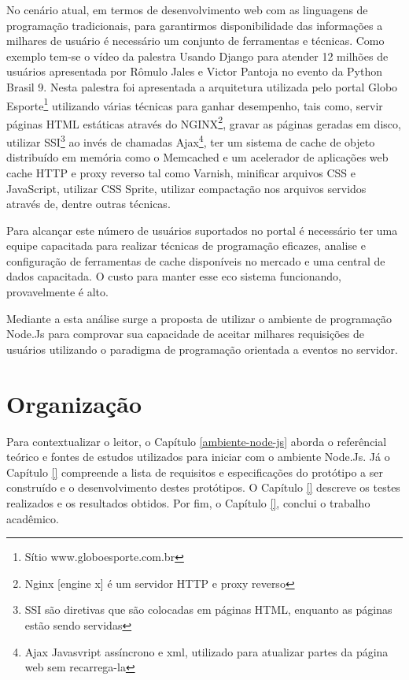   No cenário atual, em termos de desenvolvimento web com as linguagens de programação tradicionais, 
  para garantirmos disponibilidade das informações a milhares de usuário é necessário um conjunto 
  de ferramentas e técnicas. Como exemplo tem-se o vídeo da palestra Usando Django para atender 12 milhões de usuários 
  apresentada por Rômulo Jales e Victor Pantoja no evento da Python Brasil 9.
  Nesta palestra foi apresentada a arquitetura utilizada pelo portal 
  Globo Esporte\footnote{Sítio www.globoesporte.com.br} utilizando várias técnicas 
  para ganhar desempenho, tais como, servir páginas HTML estáticas através do 
  NGINX\footnote{Nginx [engine x] é um servidor HTTP e proxy reverso}, gravar as páginas geradas em 
  disco, utilizar 
  SSI\footnote{SSI são diretivas que são colocadas em páginas HTML, enquanto as páginas estão sendo servidas} 
  ao invés de chamadas 
  Ajax\footnote{Ajax Javasvript assíncrono e xml, utilizado para atualizar partes da página web sem recarrega-la}, 
  ter um sistema de cache de objeto distribuído em memória   como o Memcached e um acelerador de aplicações web
  cache HTTP e proxy reverso tal como Varnish, minificar  arquivos CSS e JavaScript, utilizar CSS Sprite, utilizar 
  compactação nos arquivos servidos através de, dentre outras técnicas.
  
  Para alcançar este número de usuários suportados no portal é necessário ter uma equipe 
  capacitada para realizar técnicas de programação eficazes, analise e configuração de ferramentas de cache 
  disponíveis no mercado e uma central de dados capacitada. O custo para manter esse eco sistema funcionando,
  provavelmente é alto.
  
  Mediante a esta análise surge a proposta de utilizar o ambiente de programação Node.Js para comprovar sua 
  capacidade de aceitar milhares requisições de usuários utilizando o paradigma de programação orientada a eventos 
  no servidor.
  
\section{Organização}
\label{organizacao}  

  Para contextualizar o leitor, o Capítulo \ref{ambiente-node-js} aborda o referêncial teórico e fontes de estudos utilizados para iniciar com o ambiente 
  Node.Js. Já o Capítulo \ref{} compreende a lista de requisitos e especificações do protótipo a ser construído e o
  desenvolvimento destes protótipos. O Capítulo \ref{} descreve os testes realizados e os resultados obtidos. 
  Por fim, o Capítulo \ref{}, conclui o trabalho acadêmico.